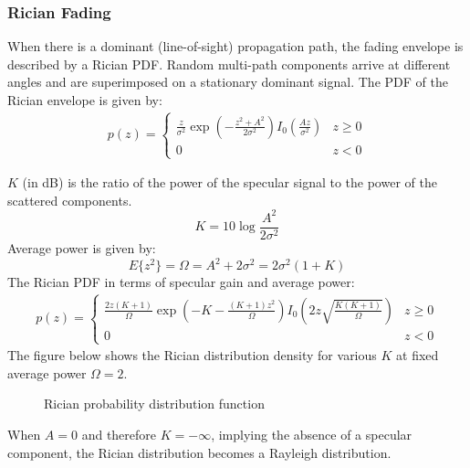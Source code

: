 \subsubsection{Rician Fading}
When there is a dominant (line-of-sight) propagation path, the fading envelope is described by a Rician \gls{PDF}\cite{AWGN}. Random multi-path components arrive at different angles and are superimposed on a stationary dominant signal. The \gls{PDF} of the Rician envelope is given by:
\begin{align*}
	p(z) =
	\begin{cases}
		\frac{z}{\sigma^2} \exp \left(-\frac{z^2 + A^2}{2\sigma^2}\right)I_0\left(\frac{Az}{\sigma^2}\right) & z \geq 0 \\
		0 & z < 0
	\end{cases}
\end{align*}
\begin{mathDef}
\end{mathDef}
\(K\) (in dB) is the ratio of the power of the specular signal to the power of the scattered components\cite{Hindu}.
\[
	K = 10 \log \frac{A^2}{2\sigma^2}
\]
Average power is given by:
\[
	E\{z^2\} = \Omega = A^2 + 2\sigma^2 = 2\sigma^2(1 + K)
\]
The Rician \gls{PDF} in terms of specular gain and average power:
\begin{align*}
	p(z) =
	\begin{cases}
		\frac{2z(K+1)}{\Omega} \exp \left(-K-\frac{(K+1)z^2}{\Omega}\right)I_0\left(2z\sqrt{\frac{K(K+1)}{\Omega}}\right) & z \geq 0 \\
		0 & z < 0
	\end{cases}
\end{align*}
The figure below shows the Rician distribution density for various \(K\) at fixed average power \(\Omega = 2\).
\begin{figure}[!h]
	\centering
	\resizebox{0.8\textwidth}{!}{}
	\caption{Rician probability distribution function}
\end{figure}

When \(A=0\) and therefore \(K=-\infty\), implying the absence of a specular component, the Rician distribution becomes a Rayleigh distribution.

